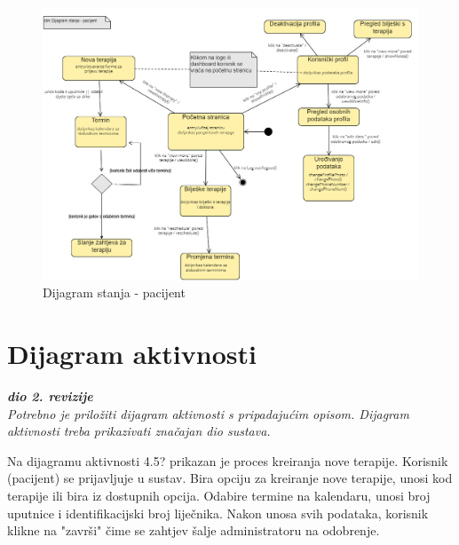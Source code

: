 			\begin{figure}[H]
			    \centering
			    \includegraphics[width=1\linewidth]{slike/dijagramStanjaPacijent.png}
			    \caption{Dijagram stanja - pacijent}
			    \label{fig:enter-label}
			\end{figure}
			\eject 
		
		\section{Dijagram aktivnosti}
			
			\textbf{\textit{dio 2. revizije}}\\
			
			 \textit{Potrebno je priložiti dijagram aktivnosti s pripadajućim opisom. Dijagram aktivnosti treba prikazivati značajan dio sustava.}\newline

            Na dijagramu aktivnosti 4.5? prikazan je proces kreiranja nove terapije. Korisnik (pacijent) se prijavljuje u sustav. Bira opciju za kreiranje nove terapije, unosi kod terapije ili bira iz dostupnih opcija. Odabire termine na kalendaru, unosi broj uputnice i identifikacijski broj liječnika. Nakon unosa svih podataka, korisnik klikne na "završi" čime se zahtjev šalje administratoru na odobrenje.            
            
